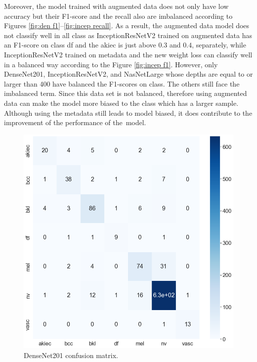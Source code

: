 \documentclass[sensors,article,accept,pdftex,moreauthors]{Definitions/mdpi}
\begin{document}
	Moreover, the model trained with augmented data does not only have low accuracy but their F1-score and the recall also are imbalanced according to Figures \ref{fig:den f1}--\ref{fig:incep recall}. As a result, the augmented data model does not classify well in all class as InceptionResNetV2 trained on augmented data has an F1-score on class df and the akiec is just above $0.3$ and $0.4$, separately, while InceptionResNetV2 trained on metadata and the new weight loss can classify well in a balanced way according to the Figure \ref{fig:incep f1}. However, only DenseNet201, InceptionResNetV2, and NasNetLarge whose depths are equal to or larger than 400 have balanced the F1-scores on class. The others still face the imbalanced term. Since this data set is not balanced, therefore using augmented data can make the model more biased to the class which has a larger sample. Although using the metadata still leads to model biased, it does contribute to the improvement of the performance of the~model.
	
	\begin{figure}[H]
		\begin{minipage}{0.48\textwidth}
\centering
\includegraphics[width=1.3\linewidth]{Definitions/CM/dn201cm}
		\end{minipage}
\caption{{DenseNet201} %
 confusion matrix.}\label{fig:densenet201cm}
		\end{figure}\unskip
		
\end{document}
